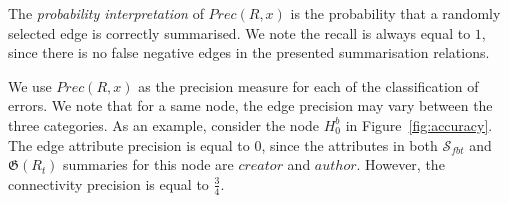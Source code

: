 The \emph{probability interpretation} of $Prec(R, x)$ is the probability that a randomly selected edge is correctly summarised. We note the recall is always equal to $1$, since there is no false negative edges in the presented summarisation relations.

We use $Prec(R, x)$ as the precision measure for each of the classification of errors. We note that for a same node, the edge precision may vary between the three categories. As an example, consider the node $H^b_0$ in Figure~\ref{fig:accuracy}. The edge attribute precision is equal to $0$, since the attributes in both $\mathcal{S}_{fbt}$ and $\mathfrak{G}(R_t)$ summaries for this node are $creator$ and $author$. However, the connectivity precision is equal to $\frac{3}{4}$.
